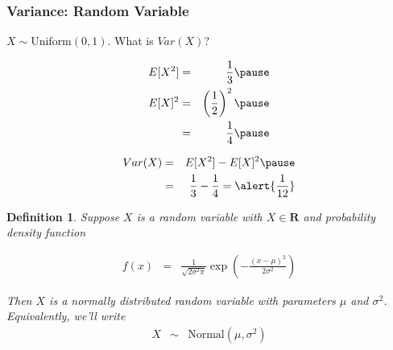 \documentclass[handout]{beamer}
\newtheorem{defn}{Definition}
\numberwithin{equation}{section}
\begin{document}
\begin{frame}
\frametitle{Variance: Random Variable} 

$X \sim \text{Uniform}(0,1)$.  What is $Var(X)$? \pause   

\begin{eqnarray} 
E[X^2] & = & \frac{1}{3} \nonumber  \pause \\
E[X]^2 & = & \left(\frac{1}{2}\right)^2 \nonumber \pause \\
& = & \frac{1}{4} \nonumber \pause  
\end{eqnarray}

\begin{eqnarray}
Var(X) & =& E[X^2] - E[X]^2  \pause \nonumber \\
& = &  \frac{1}{3} - \frac{1}{4} = \alert{\frac{1}{12}} \nonumber 
\end{eqnarray}

\end{frame}



\begin{frame}

\begin{defn}
Suppose $X$ is a random variable with $X \in \mathbf{R}$ and probability density function

\begin{eqnarray}
f(x) & = & \frac{1}{\sqrt{2\sigma^2\pi}}\exp\left(-\frac{(x - \mu)^2}{2\sigma^2}\right) \nonumber 
\end{eqnarray}

Then $X$ is a \alert{normally} distributed random variable with parameters $\mu$ and $\sigma^2$.  \\


Equivalently, we'll write 
\begin{eqnarray}
X & \sim & \text{Normal}(\mu, \sigma^2) \nonumber 
\end{eqnarray}




\end{defn}
\end{frame}
\end{document}
